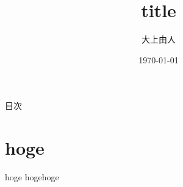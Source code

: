 \documentclass[dvipdfmx]{beamer}
\title{title}
\author{大上由人}
\date{\today}
\begin{document}
\begin{frame}
    \titlepage
\end{frame}

\begin{frame}{目次}
    \tableofcontents
\end{frame}

\section{hoge}

\begin{frame}{hoge}
    hogehoge
\end{frame}
\end{document}
